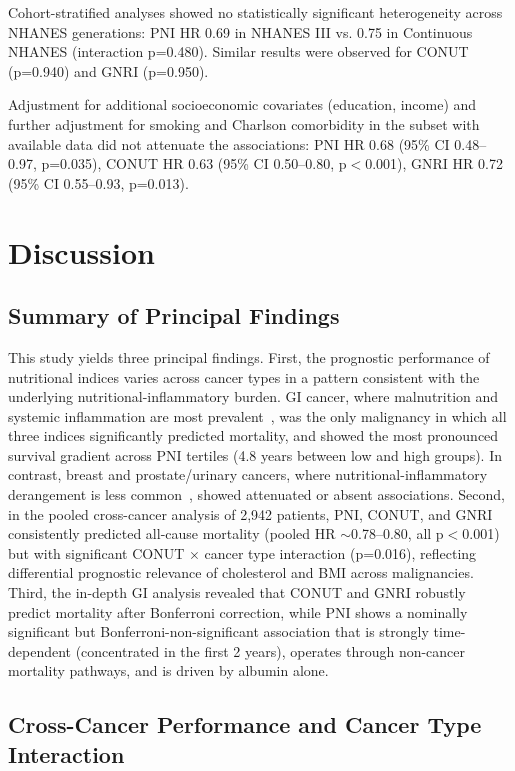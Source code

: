\documentclass[review]{elsarticle}
\begin{document}
Cohort-stratified analyses showed no statistically significant heterogeneity across NHANES generations: PNI HR 0.69 in NHANES III vs. 0.75 in Continuous NHANES (interaction p=0.480). Similar results were observed for CONUT (p=0.940) and GNRI (p=0.950).

Adjustment for additional socioeconomic covariates (education, income) and further adjustment for smoking and Charlson comorbidity in the subset with available data did not attenuate the associations: PNI HR 0.68 (95\% CI 0.48--0.97, p=0.035), CONUT HR 0.63 (95\% CI 0.50--0.80, p$<$0.001), GNRI HR 0.72 (95\% CI 0.55--0.93, p=0.013).

\section{Discussion}

\subsection{Summary of Principal Findings}

This study yields three principal findings. First, the prognostic performance of nutritional indices varies across cancer types in a pattern consistent with the underlying nutritional-inflammatory burden. GI cancer, where malnutrition and systemic inflammation are most prevalent~\cite{kapala2025,poisson2021}, was the only malignancy in which all three indices significantly predicted mortality, and showed the most pronounced survival gradient across PNI tertiles (4.8 years between low and high groups). In contrast, breast and prostate/urinary cancers, where nutritional-inflammatory derangement is less common~\cite{poisson2021}, showed attenuated or absent associations. Second, in the pooled cross-cancer analysis of 2,942 patients, PNI, CONUT, and GNRI consistently predicted all-cause mortality (pooled HR $\sim$0.78--0.80, all p$<$0.001) but with significant CONUT $\times$ cancer type interaction (p=0.016), reflecting differential prognostic relevance of cholesterol and BMI across malignancies. Third, the in-depth GI analysis revealed that CONUT and GNRI robustly predict mortality after Bonferroni correction, while PNI shows a nominally significant but Bonferroni-non-significant association that is strongly time-dependent (concentrated in the first 2 years), operates through non-cancer mortality pathways, and is driven by albumin alone.

\subsection{Cross-Cancer Performance and Cancer Type Interaction}
\end{document}
